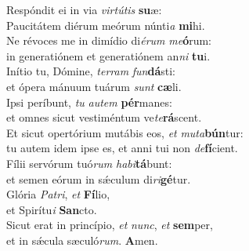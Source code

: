 \evenverse Respóndit ei in via \textit{vir}\textit{tú}\textit{tis} \textbf{su}æ:~\*\\
\evenverse Paucitátem diérum meórum núnti\textit{a} \textbf{mi}hi.\\
\oddverse Ne révoces me in dimídio di\textit{é}\textit{rum} \textit{me}\textbf{ó}rum:~\*\\
\oddverse in generatiónem et generatiónem an\textit{ni} \textbf{tu}i.\\
\evenverse Inítio tu, Dómine, \textit{ter}\textit{ram} \textit{fun}\textbf{dá}sti:~\*\\
\evenverse et ópera mánuum tuárum \textit{sunt} \textbf{cæ}li.\\
\oddverse Ipsi períbunt, \textit{tu} \textit{au}\textit{tem} \textbf{pér}manes:~\*\\
\oddverse et omnes sicut vestiméntum ve\textit{te}\textbf{rá}scent.\\
\evenverse Et sicut opertórium mutábis eos, \textit{et} \textit{mu}\textit{ta}\textbf{bún}tur:~\*\\
\evenverse tu autem idem ipse es, et anni tui non \textit{de}\textbf{fí}cient.\\
\oddverse Fílii servórum tuó\textit{rum} \textit{ha}\textit{bi}\textbf{tá}bunt:~\*\\
\oddverse et semen eórum in sǽculum di\textit{ri}\textbf{gé}tur.\\
\evenverse Glória \textit{Pa}\textit{tri}, \textit{et} \textbf{Fí}lio,~\*\\
\evenverse et Spirítu\textit{i} \textbf{San}cto.\\
\oddverse Sicut erat in princípio, \textit{et} \textit{nunc}, \textit{et} \textbf{sem}per,~\*\\
\oddverse et in sǽcula sæculó\textit{rum}. \textbf{A}men.\\

